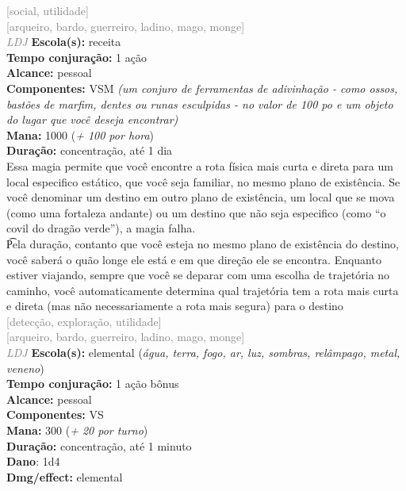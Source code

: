 \documentclass{RPG_Adventure}[2021/10/20]
\begin{document}
{\scriptsize \textcolor{gray}{[social, utilidade]\\}}
{\scriptsize \textcolor{gray}{[arqueiro, bardo, guerreiro, ladino, mago, monge]\\}}
{\tiny \textcolor{gray}{\textit{LDJ}}}
{\small \t \textbf{Escola(s):} receita\\\t \textbf{Tempo conjuração:} 1 ação\\\t \textbf{Alcance:} pessoal\\\t \textbf{Componentes:} VSM \textit{(um conjuro de ferramentas de adivinhação - como ossos, bastões de marfim, dentes ou runas esculpidas - no valor de 100 po e um objeto do lugar que você deseja encontrar)}\\\t \textbf{Mana:} 1000 (\textit{+ 100 por hora})\\\t \textbf{Duração:} concentração, até 1 dia\\}
{\normalsize Essa magia permite que você encontre a rota física mais curta e direta para um local especifico estático, que você seja familiar, no mesmo plano de existência. Se você denominar um destino em outro plano de existência, um local que se mova (como uma fortaleza andante) ou um destino que não seja especifico (como “o covil do dragão verde”), a magia falha.\\\t Pela duração, contanto que você esteja no mesmo plano de existência do destino, você saberá o quão longe ele está e em que direção ele se encontra. Enquanto estiver viajando, sempre que você se deparar com uma escolha de trajetória no caminho, você automaticamente determina qual trajetória tem a rota mais curta e direta (mas não necessariamente a rota mais segura) para o destino\\}
{\scriptsize \textcolor{gray}{[detecção, exploração, utilidade]\\}}
{\scriptsize \textcolor{gray}{[arqueiro, bardo, guerreiro, ladino, mago, monge]\\}}
{\tiny \textcolor{gray}{\textit{LDJ}}}
{\small \t \textbf{Escola(s):} elemental (\textit{água, terra, fogo, ar, luz, sombras, relâmpago, metal, veneno})\\\t \textbf{Tempo conjuração:} 1 ação bônus\\\t \textbf{Alcance:} pessoal\\\t \textbf{Componentes:} VS\\\t \textbf{Mana:} 300 (\textit{+ 20 por turno})\\\t \textbf{Duração:} concentração, até 1 minuto\\\t \textbf{Dano}: 1d4\\\t \textbf{Dmg/effect:} elemental\\}
\end{document}
